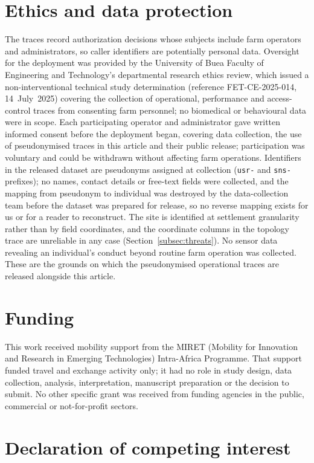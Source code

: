 \documentclass[a4paper,fleqn]{cas-sc}
\begin{document}
\section*{Ethics and data protection}

The traces record authorization decisions whose subjects include farm
operators and administrators, so caller identifiers are potentially personal
data. Oversight for the deployment was provided by the University of Buea
Faculty of Engineering and Technology's departmental research ethics review,
which issued a non-interventional technical study determination
(reference FET-CE-2025-014, 14~July~2025) covering the collection of
operational, performance and access-control traces from consenting farm
personnel; no biomedical or behavioural data were in scope. Each
participating operator and administrator gave written informed consent before
the deployment began,
covering data collection, the use of pseudonymised traces in this article and
their public release; participation was voluntary and could be withdrawn
without affecting farm operations. Identifiers in the released dataset are
pseudonyms assigned at collection (\texttt{usr-} and \texttt{sns-} prefixes);
no names, contact details or free-text fields were collected, and the
mapping from pseudonym to individual was destroyed by the data-collection
team before the dataset was prepared for release, so no reverse mapping
exists for us or for a reader to reconstruct. The site is identified at
settlement granularity rather than by field coordinates, and the coordinate
columns in the topology trace are unreliable in any case
(Section~\ref{subsec:threats}). No sensor data revealing an individual's
conduct beyond routine farm operation was collected. These are the grounds
on which the pseudonymised operational traces are released alongside this
article.

\section*{Funding}

This work received mobility support from the MIRET (Mobility for
Innovation and Research in Emerging Technologies) Intra-Africa Programme.
That support funded travel and exchange activity only; it had no role in
study design, data collection, analysis, interpretation, manuscript
preparation or the decision to submit. No other specific grant was
received from funding agencies in the public, commercial or
not-for-profit sectors.

\section*{Declaration of competing interest}
\end{document}
